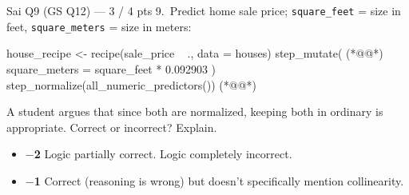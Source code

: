 \begin{qbox}{Sai Q9 (GS Q12) --- 3 / 4 pts}
9.~Predict home sale price; \texttt{square\_feet} = size in feet, \texttt{square\_meters} = size in meters:
\begin{rcode}
house_recipe <-
  recipe(sale_price ~ ., data = houses) %
  step_mutate(                                        (*@@*)
    square_meters = square_feet * 0.092903
  ) %
  step_normalize(all_numeric_predictors())            (*@@*)
\end{rcode}
A student argues that since both are normalized, keeping both in ordinary  is appropriate. Correct or incorrect? Explain.
\grader
\begin{itemize}[leftmargin=1.2em]
\item[] {\color{warnc}\bfseries $-$2} Logic partially correct.  Logic completely incorrect.
\item[$\checkmark$] {\color{warnc}\bfseries $-$1} Correct (reasoning is wrong) but doesn't specifically mention collinearity.
\end{itemize}
\end{qbox}
